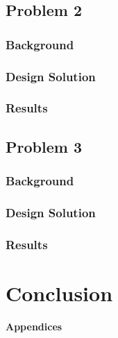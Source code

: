 \documentclass[11pt]{article}
\begin{document}
\subsection{Problem 2 }

\subsubsection{Background}

\subsubsection{Design Solution}


\subsubsection{Results}

\subsection{Problem 3}

\subsubsection{Background}


\subsubsection{Design Solution}


\subsubsection{Results}


\section{Conclusion}


\pagebreak

\textbf{Appendices}
\end{document}
